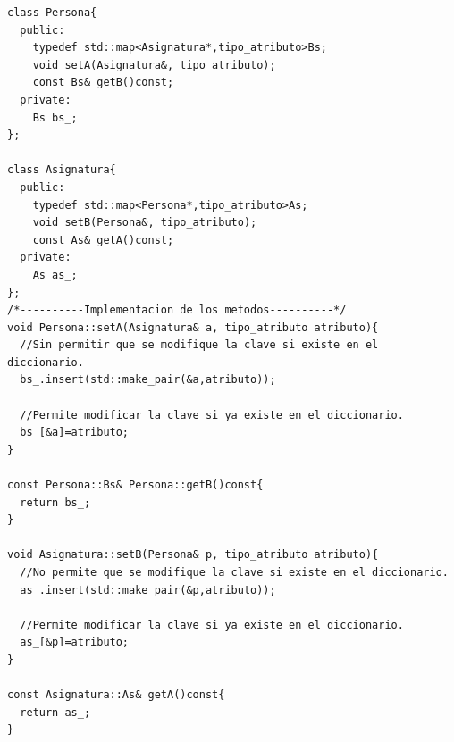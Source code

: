 \begin{center}
	\begin{lstlisting}[frame=single]
class Persona{
  public:
    typedef std::map<Asignatura*,tipo_atributo>Bs;
    void setA(Asignatura&, tipo_atributo);
    const Bs& getB()const;
  private:
    Bs bs_;
};

class Asignatura{
  public:
    typedef std::map<Persona*,tipo_atributo>As;
    void setB(Persona&, tipo_atributo);
    const As& getA()const;
  private:
    As as_;
};
/*----------Implementacion de los metodos----------*/
void Persona::setA(Asignatura& a, tipo_atributo atributo){
  //Sin permitir que se modifique la clave si existe en el diccionario.
  bs_.insert(std::make_pair(&a,atributo));

  //Permite modificar la clave si ya existe en el diccionario.
  bs_[&a]=atributo;
}

const Persona::Bs& Persona::getB()const{
  return bs_; 
}

void Asignatura::setB(Persona& p, tipo_atributo atributo){
  //No permite que se modifique la clave si existe en el diccionario.
  as_.insert(std::make_pair(&p,atributo));

  //Permite modificar la clave si ya existe en el diccionario.
  as_[&p]=atributo;
}

const Asignatura::As& getA()const{
  return as_;
}
\end{lstlisting}
\end{center}